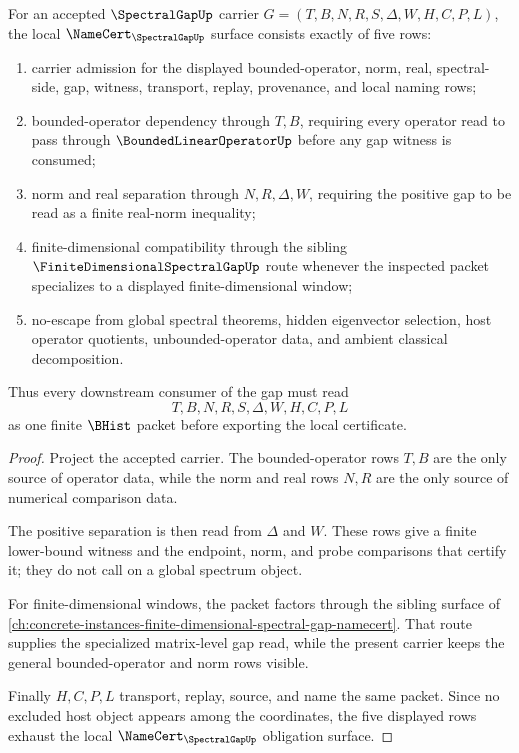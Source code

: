 \begin{theorem}
\label{thm:spectral-gap-namecert-obligation-surface}
For an accepted $\SpectralGapUp$ carrier $G=(T,B,N,R,S,\Delta,W,H,C,P,L)$, the local $\NameCert_{\SpectralGapUp}$ surface consists exactly of five rows:
\begin{enumerate}
\item carrier admission for the displayed bounded-operator, norm, real, spectral-side, gap, witness, transport, replay, provenance, and local naming rows;
\item bounded-operator dependency through $T,B$, requiring every operator read to pass through $\BoundedLinearOperatorUp$ before any gap witness is consumed;
\item norm and real separation through $N,R,\Delta,W$, requiring the positive gap to be read as a finite real-norm inequality;
\item finite-dimensional compatibility through the sibling $\FiniteDimensionalSpectralGapUp$ route whenever the inspected packet specializes to a displayed finite-dimensional window;
\item no-escape from global spectral theorems, hidden eigenvector selection, host operator quotients, unbounded-operator data, and ambient classical decomposition.
\end{enumerate}
Thus every downstream consumer of the gap must read
$$
T,B,N,R,S,\Delta,W,H,C,P,L
$$
as one finite $\BHist$ packet before exporting the local certificate.
\end{theorem}
\begin{proof}
Project the accepted carrier. The bounded-operator rows $T,B$ are the only source of operator data, while the norm and real rows $N,R$ are the only source of numerical comparison data.

The positive separation is then read from $\Delta$ and $W$. These rows give a finite lower-bound witness and the endpoint, norm, and probe comparisons that certify it; they do not call on a global spectrum object.

For finite-dimensional windows, the packet factors through the sibling surface of \autoref{ch:concrete-instances-finite-dimensional-spectral-gap-namecert}. That route supplies the specialized matrix-level gap read, while the present carrier keeps the general bounded-operator and norm rows visible.

Finally $H,C,P,L$ transport, replay, source, and name the same packet. Since no excluded host object appears among the coordinates, the five displayed rows exhaust the local $\NameCert_{\SpectralGapUp}$ obligation surface.
\end{proof}

